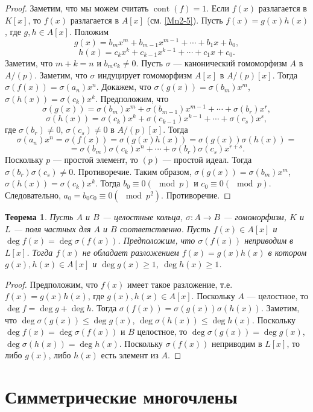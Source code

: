 \documentclass[12pt, titlepage, oneside]{amsbook}
\newcommand{\cont}{\operatorname{cont}}
\newtheorem{theorem}{Теорема}[chapter]
\theoremstyle{definition}
\theoremstyle{remark}
\begin{document}
\begin{proof}
	Заметим, что мы можем считать $\cont(f)=1$. Если $f(x)$ разлагается в $K[x]$, то $f(x)$ разлагается в $A[x]$ (см. \ref{Mn2-5}). Пусть $f(x)=g(x)h(x)$, где $g,h\in A[x]$. Положим $$g(x)=b_mx^m+b_{m-1}x^{m-1}+\cdots+b_1x+b_0,$$ $$h(x)=c_kx^k+c_{k-1}x^{k-1}+\cdots+c_1x+c_0.$$ Заметим, что $m+k=n$ и $b_mc_k\neq 0$. Пусть $\sigma$ --- канонический гомоморфизм $A$ в $A/(p)$. Заметим, что $\sigma$ индуцирует гомоморфизм $A[x]$ в $A/(p)[x]$. Тогда $\sigma(f(x))=\sigma(a_n)x^n$. Докажем, что $\sigma(g(x))=\sigma(b_m)x^m$, $\sigma(h(x))=\sigma(c_k)x^k$. Предположим, что $$\sigma(g(x))=\sigma(b_m)x^m+\sigma(b_{m-1})x^{m-1}+\cdots+\sigma(b_r)x^r,$$ $$\sigma(h(x))=\sigma(c_k)x^k+\sigma(c_{k-1})x^{k-1}+\cdots+\sigma(c_s)x^s,$$ где $\sigma(b_r)\neq 0$, $\sigma(c_s)\neq 0$ в $A/(p)[x]$. Тогда $$\sigma(a_n)x^n=\sigma(f(x))=\sigma(g(x)h(x))=\sigma(g(x))\sigma(h(x))=$$ $$=\sigma(b_m)\sigma(c_k)x^n+\cdots+\sigma(b_r)\sigma(c_s)x^{r+s}.$$ Поскольку $p$ --- простой элемент, то $(p)$ --- простой идеал. Тогда $\sigma(b_r)\sigma(c_s)\neq 0$. Противоречие. Таким образом, $\sigma(g(x))=\sigma(b_m)x^m$, $\sigma(h(x))=\sigma(c_k)x^k$. Тогда $b_0\equiv 0(\mod p)$ и $c_0\equiv 0(\mod p)$. Следовательно, $a_0=b_0c_0\equiv 0(\mod p^2)$. Противоречие.
\end{proof}

\begin{theorem}
	\label{Mn2-9}
	Пусть $A$ и $B$ --- целостные кольца, $\sigma\colon A\rightarrow B$ --- гомоморфизм, $K$ и $L$ --- поля частных для $A$ и $B$ соответственно. Пусть $f(x)\in A[x]$ и $\deg f(x)=\deg\sigma(f(x))$. Предположим, что $\sigma(f(x))$ неприводим в $L[x]$. Тогда $f(x)$ не обладает разложением $f(x)=g(x)h(x)$ в котором $g(x),h(x)\in A[x]$ и $\deg g(x)\geq 1$, $\deg h(x)\geq 1$.
\end{theorem}


\begin{proof}
	Предположим, что $f(x)$ имеет такое разложение, т.е. $f(x)=g(x)h(x)$, где $g(x),h(x)\in A[x]$. Поскольку $A$ --- целостное, то $\deg f=\deg g+\deg h$. Тогда $\sigma(f(x))=\sigma(g(x))\sigma(h(x))$. Заметим, что $\deg\sigma(g(x))\leq\deg g(x)$, $\deg\sigma(h(x))\leq\deg h(x)$. Поскольку $\deg f(x)=\deg\sigma(f(x))$ и $B$ целостное, то $\deg\sigma(g(x))=\deg g(x)$, $\deg\sigma(h(x))=\deg h(x)$. Поскольку $\sigma(f(x))$ неприводим в $L[x]$, то либо $g(x)$, либо $h(x)$ есть элемент из $A$.
\end{proof}

\section{Симметрические многочлены}
\end{document}

